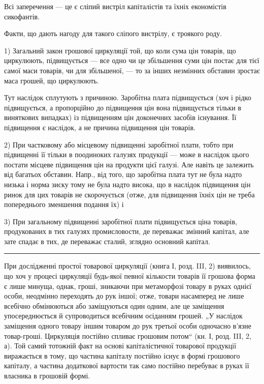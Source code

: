 
Всі заперечення — це є сліпий вистріл капіталістів та їхніх економістів
сикофантів.

Факти, що дають нагоду для такого сліпого вистрілу, є троякого роду.

1) Загальний закон грошової циркуляції той, що коли сума цін товарів,
що циркулюють, підвищується — все одно чи це збільшення суми
цін постає для тієї самої маси товарів, чи для збільшеної, — то за інших
незмінних обставин зростає маса грошей, що циркулюють.

Тут наслідок сплутують з причиною. Заробітна плата підвищується (хоч
і рідко підвищується, а пропорційно до підвищення цін вона підвищується
тільки в виняткових випадках) із підвищенням цін доконечних засобів існування.
Її підвищення є наслідок, а не причина підвищення цін товарів.

2) При частковому або місцевому підвищенні заробітної плати, тобто
при підвищенні її тільки в поодиноких галузях продукції — може в наслідок
цього постати місцеве підвищення цін на продукти цієї галузі. Але навіть
це залежить від багатьох обставин. Напр., від того, що заробітна плата
тут не була надто низька і норма зиску тому не була надто висока, що
в наслідок підвищення цін ринок для цих товарів не скорочується
(отже, для підвищення їхніх цін не треба попереднього зменшення
подання їх) і~

3) При загальному підвищенні заробітної плати підвищується ціна товарів,
продукованих в тих галузях промисловости, де переважає змінний капітал,
але зате спадає в тих, де переважає сталий, зглядно основний капітал.

\pfbreak{}

При дослідженні простої товарової циркуляції (книга І, розд. III, 2) виявилось,
що хоч у процесі циркуляції будь-якої певної кількости товарів її
грошова форма є лише минуща, однак, гроші, зникаючи при метаморфозі
товару в руках однієї особи, неодмінно переходять до рук іншої; отже,
товари насамперед не лише всебічно обмінюються або заміщуються один
одним, але це заміщення упосереднюється й супроводиться всебічним
осіданням грошей. „У наслідок заміщення одного товару іншим товаром
до рук третьої особи одночасно в’язне товар-гроші. Циркуляція постійно
спливає грошовим потом“ (кн. І, розд. III, 2, а). Той самий тотожній
факт на основі капіталістичної товарової продукції виражається в тому,
що частина капіталу постійно існує в формі грошового капіталу, а частина
додаткової вартости так само постійно перебуває в руках її власника
в грошовій формі.


